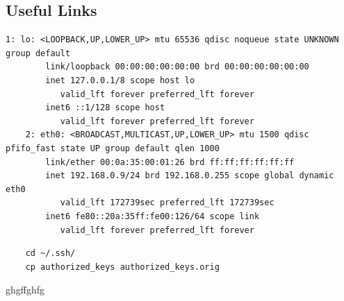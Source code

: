 \documentclass{article}
\begin{document}
\subsection{Useful Links}





\begin{lstlisting}[breaklines=true, breakatwhitespace=true]
    1: lo: <LOOPBACK,UP,LOWER_UP> mtu 65536 qdisc noqueue state UNKNOWN group default 
        link/loopback 00:00:00:00:00:00 brd 00:00:00:00:00:00
        inet 127.0.0.1/8 scope host lo
           valid_lft forever preferred_lft forever
        inet6 ::1/128 scope host 
           valid_lft forever preferred_lft forever
    2: eth0: <BROADCAST,MULTICAST,UP,LOWER_UP> mtu 1500 qdisc pfifo_fast state UP group default qlen 1000
        link/ether 00:0a:35:00:01:26 brd ff:ff:ff:ff:ff:ff
        inet 192.168.0.9/24 brd 192.168.0.255 scope global dynamic eth0
           valid_lft 172739sec preferred_lft 172739sec
        inet6 fe80::20a:35ff:fe00:126/64 scope link 
           valid_lft forever preferred_lft forever
\end{lstlisting}


\begin{lstlisting}
    cd ~/.ssh/
    cp authorized_keys authorized_keys.orig
\end{lstlisting}


ghgffghfg
\end{document}
